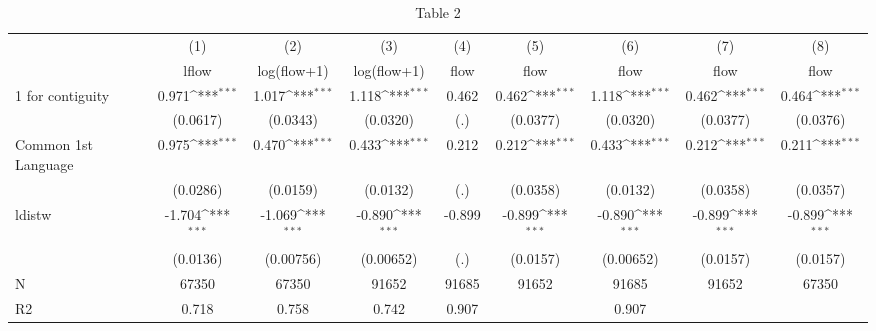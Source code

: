 \begin{table}[htbp]\centering
\def\sym#1{\ifmmode^{#1}\else\(^{#1}\)\fi}
\caption{Table 2}
\begin{tabular}{l*{8}{c}}
\hline\hline
                    &\multicolumn{1}{c}{(1)}&\multicolumn{1}{c}{(2)}&\multicolumn{1}{c}{(3)}&\multicolumn{1}{c}{(4)}&\multicolumn{1}{c}{(5)}&\multicolumn{1}{c}{(6)}&\multicolumn{1}{c}{(7)}&\multicolumn{1}{c}{(8)}\\
                    &\multicolumn{1}{c}{lflow}&\multicolumn{1}{c}{log(flow+1)}&\multicolumn{1}{c}{log(flow+1)}&\multicolumn{1}{c}{flow}&\multicolumn{1}{c}{flow}&\multicolumn{1}{c}{flow}&\multicolumn{1}{c}{flow}&\multicolumn{1}{c}{flow}\\
\hline
1 for contiguity    &       0.971\sym{***}&       1.017\sym{***}&       1.118\sym{***}&       0.462			&       0.462\sym{***}&       1.118\sym{***}&       0.462\sym{***}&       0.464\sym{***}\\
                    &    (0.0617)         &    (0.0343)         &    (0.0320)         &    (.)         		&    (0.0377)         &    (0.0320)         &    (0.0377)         &    (0.0376)         \\
[1em]
Common 1st Language &       0.975\sym{***}&       0.470\sym{***}&       0.433\sym{***}&       0.212			&       0.212\sym{***}&       0.433\sym{***}&       0.212\sym{***}&       0.211\sym{***}\\
                    &    (0.0286)         &    (0.0159)         &    (0.0132)         &    (.)       		&    (0.0358)         &    (0.0132)         &    (0.0358)         &    (0.0357)         \\
[1em]
ldistw              &      -1.704\sym{***}&      -1.069\sym{***}&      -0.890\sym{***}&      -0.899			&      -0.899\sym{***}&      -0.890\sym{***}&      -0.899\sym{***}&      -0.899\sym{***}\\
                    &    (0.0136)         &   (0.00756)         &   (0.00652)         &   (.)        		&    (0.0157)         &   (0.00652)         &    (0.0157)         &    (0.0157)         \\
\hline
N                   &       67350         &       67350         &       91652         &       91685         &       91652         &       91685         &       91652         &       67350         \\
R2                  &       0.718         &       0.758         &       0.742         &       0.907         &                     &       0.907         &                     &                     \\

\end{tabular}
\end{table}
